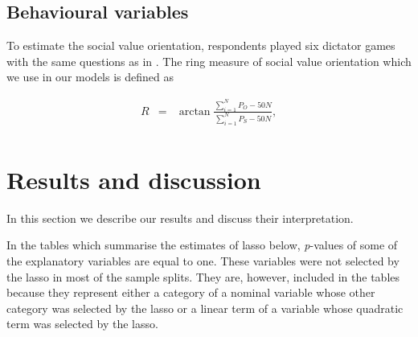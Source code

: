 \documentclass[a4paper,12pt]{article}
\begin{document}
\vspace{1cm}







\subsection{Behavioural variables}\label{BehaviouralVars}


To estimate the social value orientation, respondents played six dictator games with the same questions as in \citet{murphy2011SVO}. The ring measure of social value orientation which we use in our models is defined as

\begin{equation}\label{RingMeasure}
\begin{array}{lcll}

R&=&\arctan \frac{\sum_{i=1}^{N} P_O -50N}{\sum_{i=1}^{N} P_S -50N}, \\
\end{array}
\end{equation}




\FloatBarrier
	\section{Results and discussion}\label{Results}
In this section we describe our results and discuss their interpretation.

In the tables which summarise the estimates of lasso below, \textit{p}-values of some of the explanatory variables are equal to one. These variables were not selected by the lasso in most of the sample splits. They are, however, included in the tables because they represent either a category of a nominal variable whose other category was selected by the lasso or a linear term of a variable whose quadratic term was selected by the lasso. 
\end{document}
